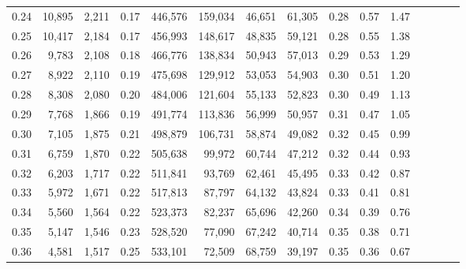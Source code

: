 \begin{tabular}{rrrcrrrrrrrrrrr}
0.24 &  10,895 &  2,211 &                                       0.17 &  446,576 &  159,034 &   46,651 &   61,305 &  0.28 &  0.57 &                         1.47 \\
0.25 &  10,417 &  2,184 &                                       0.17 &  456,993 &  148,617 &   48,835 &   59,121 &  0.28 &  0.55 &                         1.38 \\
0.26 &   9,783 &  2,108 &                                       0.18 &  466,776 &  138,834 &   50,943 &   57,013 &  0.29 &  0.53 &                         1.29 \\
0.27 &   8,922 &  2,110 &                                       0.19 &  475,698 &  129,912 &   53,053 &   54,903 &  0.30 &  0.51 &                         1.20 \\
0.28 &   8,308 &  2,080 &                                       0.20 &  484,006 &  121,604 &   55,133 &   52,823 &  0.30 &  0.49 &                         1.13 \\
0.29 &   7,768 &  1,866 &                                       0.19 &  491,774 &  113,836 &   56,999 &   50,957 &  0.31 &  0.47 &                         1.05 \\
0.30 &   7,105 &  1,875 &                                       0.21 &  498,879 &  106,731 &   58,874 &   49,082 &  0.32 &  0.45 &                         0.99 \\
0.31 &   6,759 &  1,870 &                                       0.22 &  505,638 &   99,972 &   60,744 &   47,212 &  0.32 &  0.44 &                         0.93 \\
0.32 &   6,203 &  1,717 &                                       0.22 &  511,841 &   93,769 &   62,461 &   45,495 &  0.33 &  0.42 &                         0.87 \\
0.33 &   5,972 &  1,671 &                                       0.22 &  517,813 &   87,797 &   64,132 &   43,824 &  0.33 &  0.41 &                         0.81 \\
0.34 &   5,560 &  1,564 &                                       0.22 &  523,373 &   82,237 &   65,696 &   42,260 &  0.34 &  0.39 &                         0.76 \\
0.35 &   5,147 &  1,546 &                                       0.23 &  528,520 &   77,090 &   67,242 &   40,714 &  0.35 &  0.38 &                         0.71 \\
0.36 &   4,581 &  1,517 &                                       0.25 &  533,101 &   72,509 &   68,759 &   39,197 &  0.35 &  0.36 &                         0.67 \\

\end{tabular}
